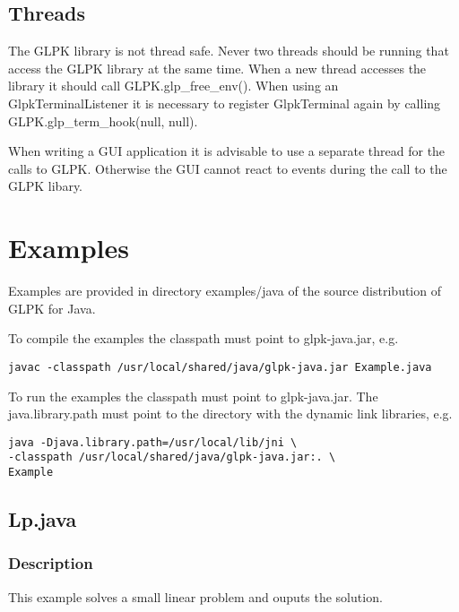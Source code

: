 \documentclass[a4paper,11pt]{report}
\begin{document}
\section{Threads}
The GLPK library is not thread safe. Never two threads should be running that
access the GLPK library at the same time. When a new thread accesses the
library it should call GLPK.glp\_free\_env(). When using an GlpkTerminalListener
it is necessary to register GlpkTerminal again by calling
\linebreak GLPK.glp\_term\_hook(null, null).

When writing a GUI application it is advisable to use a separate thread for
the calls to GLPK. Otherwise the GUI cannot react to events during the call
to the GLPK libary.

\chapter{Examples}

Examples are provided in directory examples/java of the source distribution of
GLPK for Java.

To compile the examples the classpath must point to glpk-java.jar, e.g.
\begin{verbatim}
javac -classpath /usr/local/shared/java/glpk-java.jar Example.java
\end{verbatim}
To run the examples the classpath must point to glpk-java.jar. The java.library.path
must point to the directory with the dynamic link libraries, e.g.
\begin{verbatim}
java -Djava.library.path=/usr/local/lib/jni \
-classpath /usr/local/shared/java/glpk-java.jar:. \
Example
\end{verbatim}

\section{Lp.java}

\subsection{Description}
This example solves a small linear problem and ouputs the solution.
\end{document}
